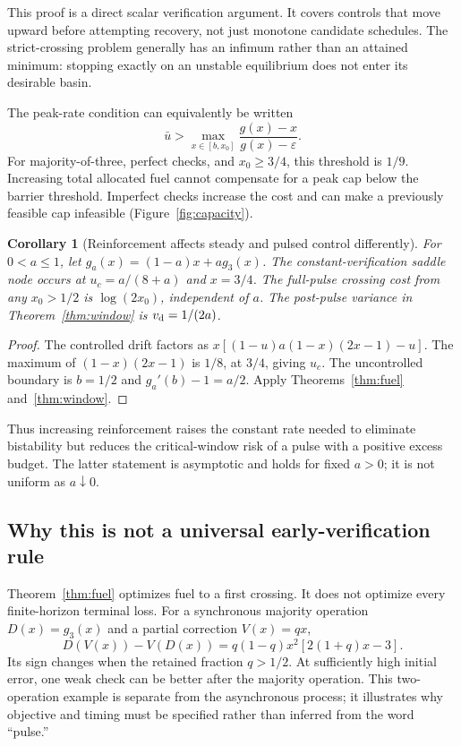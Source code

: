 \documentclass[11pt]{article}
\newtheorem{corollary}[theorem]{Corollary}
\theoremstyle{remark}\newtheorem{remark}[theorem]{Remark}
\newcommand{\eps}{\varepsilon}
\begin{document}
This proof is a direct scalar verification argument. It covers controls that move upward before attempting recovery, not just monotone candidate schedules. The strict-crossing problem generally has an infimum rather than an attained minimum: stopping exactly on an unstable equilibrium does not enter its desirable basin.

The peak-rate condition can equivalently be written
\begin{equation}
 \bar u>\max_{x\in[b,x_0]}\frac{g(x)-x}{g(x)-\eps}.
 \label{eq:peak}
\end{equation}
For majority-of-three, perfect checks, and $x_0\ge3/4$, this threshold is $1/9$. Increasing total allocated fuel cannot compensate for a peak cap below the barrier threshold. Imperfect checks increase the cost and can make a previously feasible cap infeasible (Figure~\ref{fig:capacity}).

\begin{corollary}[Reinforcement affects steady and pulsed control differently]
\label{cor:reinforcement}
For $0<a\le1$, let $g_a(x)=(1-a)x+a g_3(x)$. The constant-verification saddle node occurs at $u_c=a/(8+a)$ and $x=3/4$. The full-pulse crossing cost from any $x_0>1/2$ is $\log(2x_0)$, independent of $a$. The post-pulse variance in Theorem~\ref{thm:window} is $v_{\rm d}=1/(2a)$.
\end{corollary}
\begin{proof}
The controlled drift factors as $x[(1-u)a(1-x)(2x-1)-u]$. The maximum of $(1-x)(2x-1)$ is $1/8$, at $3/4$, giving $u_c$. The uncontrolled boundary is $b=1/2$ and $g_a'(b)-1=a/2$. Apply Theorems~\ref{thm:fuel} and~\ref{thm:window}.
\end{proof}
Thus increasing reinforcement raises the constant rate needed to eliminate bistability but reduces the critical-window risk of a pulse with a positive excess budget. The latter statement is asymptotic and holds for fixed $a>0$; it is not uniform as $a\downarrow0$.

\subsection{Why this is not a universal early-verification rule}
Theorem~\ref{thm:fuel} optimizes fuel to a first crossing. It does not optimize every finite-horizon terminal loss. For a synchronous majority operation $D(x)=g_3(x)$ and a partial correction $V(x)=qx$,
\begin{equation}
 D(V(x))-V(D(x))=q(1-q)x^2[2(1+q)x-3].
 \label{eq:commutator}
\end{equation}
Its sign changes when the retained fraction $q>1/2$. At sufficiently high initial error, one weak check can be better after the majority operation. This two-operation example is separate from the asynchronous process; it illustrates why objective and timing must be specified rather than inferred from the word ``pulse.''
\end{document}
